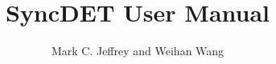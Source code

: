 \documentclass{article}
\begin{document}
\title{SyncDET User Manual}
\author{Mark C. Jeffrey and Weihan Wang}
\date{}

\maketitle




\end{document}
